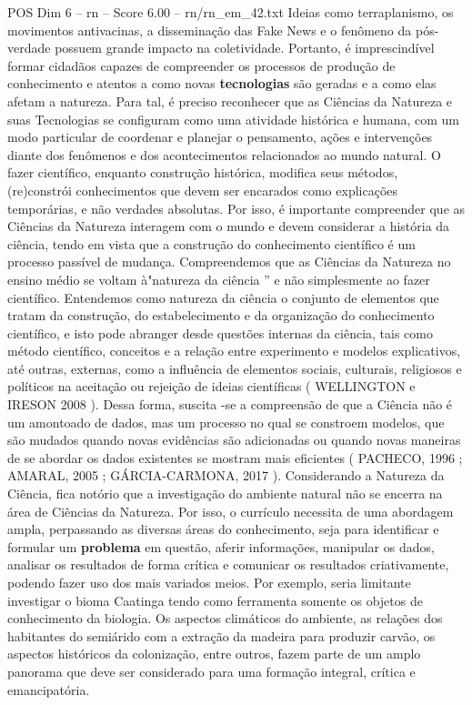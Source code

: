 \begin{textsample}{POS Dim 6 – rn – Score 6.00 – rn/rn\_em\_42.txt}
Ideias como terraplanismo, os movimentos antivacinas, a disseminação das Fake News e o fenômeno da pós-verdade possuem grande impacto na coletividade.
Portanto, é imprescindível formar cidadãos capazes de compreender os processos de produção de conhecimento e atentos a como novas \textbf{tecnologias} são geradas e a como elas afetam a natureza.
Para tal, é preciso reconhecer que as Ciências da Natureza e suas Tecnologias se configuram como uma atividade histórica e humana, com um modo particular de coordenar e planejar o pensamento, ações e intervenções diante dos fenômenos e dos acontecimentos relacionados ao mundo natural.
O fazer científico, enquanto construção histórica, modifica seus métodos, (re)constrói conhecimentos que devem ser encarados como explicações temporárias, e não verdades absolutas.
Por isso, é importante compreender que as Ciências da Natureza interagem com o mundo e devem considerar a história da ciência, tendo em vista que a construção do conhecimento científico é um processo passível de mudança.
Compreendemos que as Ciências da Natureza no ensino médio se voltam à"natureza da ciência ” e não simplesmente ao fazer científico.
Entendemos como natureza da ciência o conjunto de elementos que tratam da construção, do estabelecimento e da organização do conhecimento científico, e isto pode abranger desde questões internas da ciência, tais como método científico, conceitos e a relação entre experimento e modelos explicativos, até outras, externas, como a influência de elementos sociais, culturais, religiosos e políticos na aceitação ou rejeição de ideias científicas ( WELLINGTON e IRESON 2008 ).
Dessa forma, suscita -se a compreensão de que a Ciência não é um amontoado de dados, mas um processo no qual se constroem modelos, que são mudados quando novas evidências são adicionadas ou quando novas maneiras de se abordar os dados existentes se mostram mais eficientes ( PACHECO, 1996 ; AMARAL, 2005 ; GÁRCIA-CARMONA, 2017 ).
Considerando a Natureza da Ciência, fica notório que a investigação do ambiente natural não se encerra na área de Ciências da Natureza.
Por isso, o currículo necessita de uma abordagem ampla, perpassando as diversas áreas do conhecimento, seja para identificar e formular um \textbf{problema} em questão, aferir informações, manipular os dados, analisar os resultados de forma crítica e comunicar os resultados criativamente, podendo fazer uso dos mais variados meios.
Por exemplo, seria limitante investigar o bioma Caatinga tendo como ferramenta somente os objetos de conhecimento da biologia.
Os aspectos climáticos do ambiente, as relações dos habitantes do semiárido com a extração da madeira para produzir carvão, os aspectos históricos da colonização, entre outros, fazem parte de um amplo panorama que deve ser considerado para uma formação integral, crítica e emancipatória.

\end{textsample}
